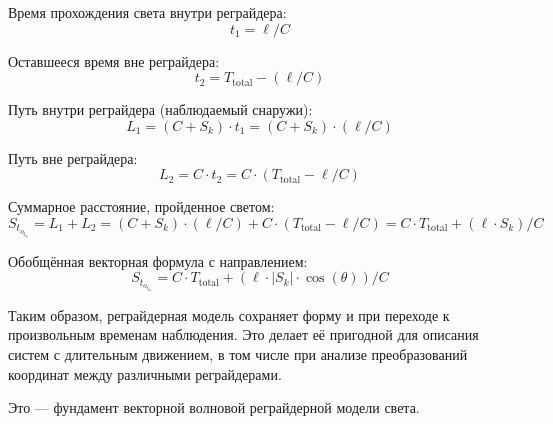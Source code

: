 \documentclass[12pt]{article}
\begin{document}
Время прохождения света внутри реграйдера:
\[
t_1 = \ell / C
\]

Оставшееся время вне реграйдера:
\[
t_2 = T_{\text{total}} - (\ell / C)
\]

Путь внутри реграйдера (наблюдаемый снаружи):
\[
L_1 = (C + S_k) \cdot t_1 = (C + S_k) \cdot (\ell / C)
\]

Путь вне реграйдера:
\[
L_2 = C \cdot t_2 = C \cdot (T_{\text{total}} - \ell / C)
\]

Суммарное расстояние, пройденное светом:
\[
S_t_o_t_a_l = L_1 + L_2 = (C + S_k) \cdot (\ell / C) + C \cdot (T_{\text{total}} - \ell / C) = C \cdot T_{\text{total}} + (\ell \cdot S_k) / C
\]

Обобщённая векторная формула с направлением:
\[
S_t_o_t_a_l = C \cdot T_{\text{total}} + (\ell \cdot \left|S_k\right| \cdot \cos(\theta)) / C
\]

Таким образом, реграйдерная модель сохраняет форму и при переходе к произвольным временам наблюдения. Это делает её пригодной для описания систем с длительным движением, в том числе при анализе преобразований координат между различными реграйдерами.

Это — фундамент векторной волновой реграйдерной модели света.
\end{document}
